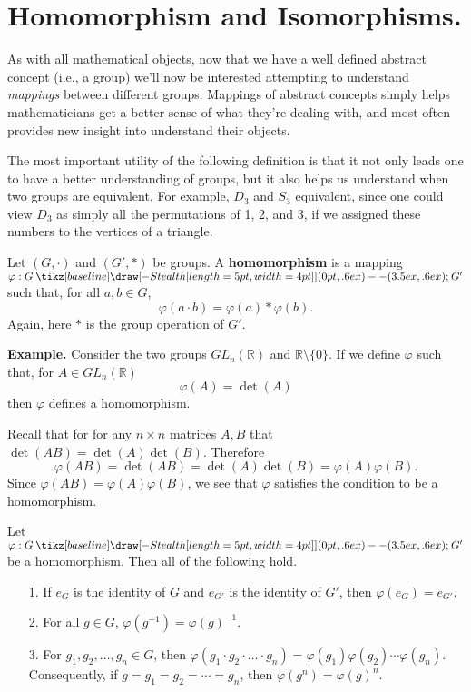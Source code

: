 \documentclass[12pt,letterpaper]{algebra_book}
\renewcommand{\to}{\mathbin{\tikz[baseline] \draw[-{Stealth[length=5pt,width=4pt]}] (0pt,.6ex) -- (3.5ex,.6ex);}}
\renewcommand{\phi}{\varphi}
\theoremstyle{definition}
\begin{document}
    \section{Homomorphism and Isomorphisms.} 
    {\color{BlueViolet}As with all mathematical objects, now that we have a well defined
    abstract concept (i.e., a group) we'll now be interested
    attempting to understand \textit{mappings} between different
    groups. Mappings of abstract concepts simply helps mathematicians
    get a better sense of what they're dealing with, and most often
    provides new insight into understand their objects. 
    
    The most important utility of the following definition is that it
    not only leads one to have a better understanding of groups, but it
    also helps us understand when two groups are equivalent. For
    example, $D_3$ and $S_3$ equivalent, since one could view $D_3$
    as simply all the permutations of 1, 2, and 3, if we assigned these
    numbers to the vertices of a triangle.
    }

    \begin{definition}
        Let $(G, \cdot)$ and $(G', *)$ be groups. A
        \textbf{homomorphism} is a mapping $\phi: G \to G'$ such that,
       for all $a, b \in G$, 
        \[
            \phi(a \cdot b) = \phi(a) * \phi(b).
        \]
        {\color{red}Again, here $*$ is the group operation of $G'$.}

    \end{definition}

    \textbf{Example.} Consider the two groups $GL_n(\mathbb{R})$ and
    $\mathbb{R}\setminus\{0\}$. If we define $\phi$ such that, for $A \in
    GL_n(\mathbb{R})$ 
    \[
        \phi(A) = \det(A)
    \]
    then $\phi$ defines a homomorphism. 
    
    Recall that for for any $n
    \times n$ matrices $A, B$ that $\det(AB) = \det(A)\det(B)$.
    Therefore 
    \[
        \phi(AB) = \det(AB) = \det(A)\det(B) = \phi(A)\phi(B).
    \]
    Since $\phi(AB) = \phi(A)\phi(B)$, we see that $\phi$ satisfies
    the condition to be a homomorphism.

    \begin{proposition}
        Let $\phi: G \to G'$ be a homomorphism. Then all of the
        following hold.
        \begin{itemize}
            \item[1.] If $e_G$ is the identity of $G$ and $e_{G'}$ is
            the identity of $G'$, then $\phi(e_G) = e_{G'}$.

            \item[2.] For all $g \in G$, $\phi(g^{-1}) =
            \phi(g)^{-1}$. 

            \item[3.] For $g_1, g_2, \dots, g_n \in G$, then $\phi(g_1
            \cdot g_2 \cdot \dots \cdot g_n) =
            \phi(g_1)\phi(g_2)\cdots\phi(g_n)$. Consequently, if $g = g_1 =
            g_2 = \cdots = g_n$, then $\phi(g^n) = \phi(g)^{n}$.
        \end{itemize}
    \end{proposition}
\end{document}
